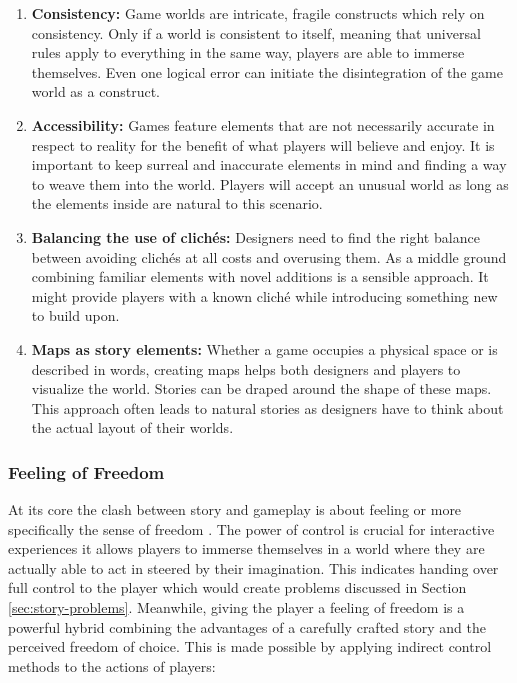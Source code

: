 \begin{enumerate}
    \item \textbf{Consistency:} Game worlds are intricate, fragile constructs which rely on consistency. Only if a world is consistent to itself, meaning that universal rules apply to everything in the same way, players are able to immerse themselves. Even one logical error can initiate the disintegration of the game world as a construct.
    \item \textbf{Accessibility:} Games feature elements that are not necessarily accurate in respect to reality for the benefit of what players will believe and enjoy. It is important to keep surreal and inaccurate elements in mind and finding a way to weave them into the world. Players will accept an unusual world as long as the elements inside are natural to this scenario.
    \item \textbf{Balancing the use of clich\'es:} Designers need to find the right balance between avoiding clich\'es at all costs and overusing them. As a middle ground combining familiar elements with novel additions is a sensible approach. It might provide players with a known clich\'e while introducing something new to build upon.
    \item \textbf{Maps as story elements:} Whether a game occupies a physical space or is described in words, creating maps helps both designers and players to visualize the world. Stories can be draped around the shape of these maps. This approach often leads to natural stories as designers have to think about the actual layout of their worlds.
\end{enumerate}

\subsubsection{Feeling of Freedom} \label{sec:story-freedom}
At its core the clash between story and gameplay is about feeling or more specifically the sense of freedom \cite{Schell2014}.
The power of control is crucial for interactive experiences it allows players to immerse themselves in a world where they are actually able to act in steered by their imagination.
This indicates handing over full control to the player which would create problems discussed in Section \ref{sec:story-problems}.
Meanwhile, giving the player a feeling of freedom is a powerful hybrid combining the advantages of a carefully crafted story and the perceived freedom of choice.
This is made possible by applying indirect control methods to the actions of players:

